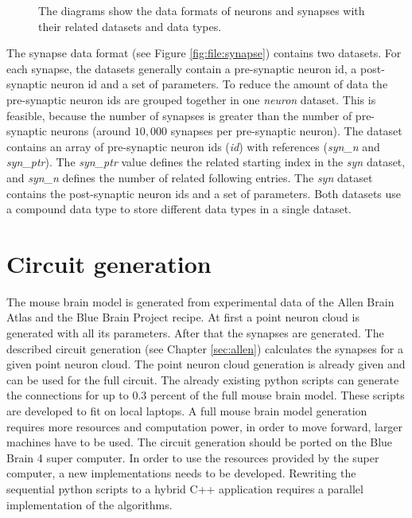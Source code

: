 \begin{figure}[ht!]
\begin{center}
{       }
    	   \end{center}
    	\caption[Data formats of neurons and synapses with their related datasets and data types]{%
        The diagrams show the data formats of neurons and synapses with their related datasets and data types.
     }%
   \label{fig:file}
   \end{figure}
   
The synapse data format (see Figure \ref{fig:file:synapse}) contains two datasets. For each synapse, the datasets generally contain
a pre-synaptic neuron id, a post-synaptic neuron id and a set of parameters.
To reduce the amount of data the pre-synaptic neuron ids are grouped together in one \emph{neuron} dataset.
This is feasible, because
the number of synapses is greater than the number of pre-synaptic neurons (around $10,000$ synapses per pre-synaptic neuron).
The dataset contains an array of pre-synaptic neuron ids (\emph{id}) with references (\emph{syn\_n} and \emph{syn\_ptr}).
The \emph{syn\_ptr} value defines the related starting index in the \emph{syn} dataset,
and \emph{syn\_n} defines the number of related following entries.
The \emph{syn} dataset contains the post-synaptic neuron ids and a set of parameters.
Both datasets use a compound data type to store different data types in a single dataset.


\section{Circuit generation}
The mouse brain model is generated from experimental data of the Allen Brain Atlas and
the Blue Brain Project recipe.
At first a point neuron cloud is generated with all its parameters.
After that the synapses are generated.
The described circuit generation (see Chapter \ref{sec:allen}) calculates the synapses for a given point neuron cloud.
The point neuron cloud generation is already given and can be used for the full circuit.
The already existing python scripts can generate the connections for up to $0.3$ percent of the full mouse brain model.
These scripts are developed to fit on local laptops.
A full mouse brain model generation requires more resources and computation power, in order to move forward, larger machines have to be used.
The circuit generation should be ported on the Blue Brain 4 super computer.
In order to use the resources provided by the super computer, a new implementations needs to be developed. 
Rewriting the sequential python scripts to a hybrid C++ application requires a parallel implementation of the algorithms.


